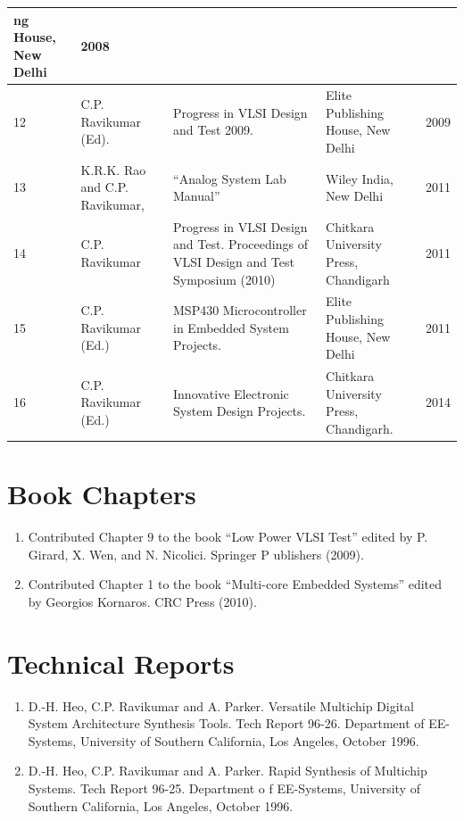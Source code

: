 \documentclass[onecolumn]{IEEEtran}
\begin{document}
\begin{longtable}{|l| p{2cm} | p{5cm} | p{2cm}|p{1cm}|}
ng House, New Delhi     & 2008\\\hline
12      & C.P. Ravikumar (Ed). & Progress in VLSI Design and Test 2009.         & Elite Publishing House, New Delhi
& 2009\\\hline
13      & K.R.K. Rao and C.P. Ravikumar, & “Analog System Lab Manual”   & Wiley India, New Delhi        & 2011\\\hline
14      & C.P. Ravikumar & Progress in VLSI Design and Test.  Proceedings of VLSI Design and Test Symposium (2010) & Chitkara University Press, Chandigarh   & 2011\\\hline
15      & C.P. Ravikumar (Ed.) & MSP430 Microcontroller in Embedded System Projects.    & Elite Publishing House, New Delhi     & 2011\\\hline
16      & C.P. Ravikumar (Ed.) & Innovative Electronic System Design Projects. & Chitkara University Press, Chandigarh. & 2014\\\hline
\end{longtable}

\section*{Book Chapters}
\begin{enumerate}
\item   Contributed Chapter 9 to the book “Low Power VLSI Test” edited by P. Girard, X. Wen, and N. Nicolici. Springer P
ublishers (2009).
\item   Contributed Chapter 1 to the book “Multi-core Embedded Systems” edited by Georgios Kornaros. CRC Press (2010).
\end{enumerate}

\section*{Technical Reports}
\begin{enumerate}
\item   D.-H. Heo, C.P. Ravikumar and A. Parker.  Versatile Multichip Digital System Architecture Synthesis Tools.  Tech
 Report 96-26. Department of EE-Systems, University of Southern California, Los Angeles, October 1996.
\item   D.-H. Heo, C.P. Ravikumar and A. Parker.  Rapid Synthesis of Multichip Systems.  Tech Report 96-25. Department o
f EE-Systems, University of Southern California, Los Angeles, October 1996.

\end{enumerate}
\end{document}
